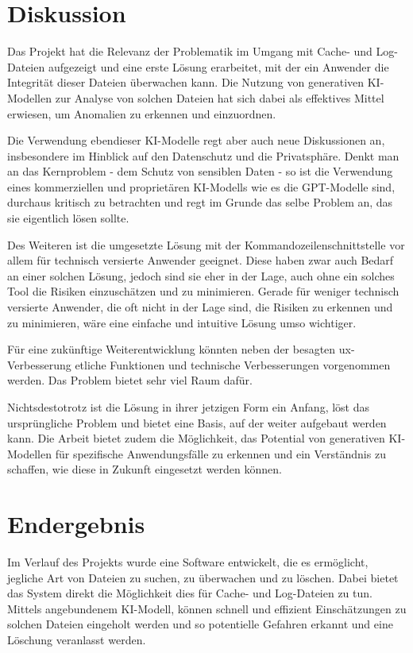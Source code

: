 \documentclass[a4paper,12pt]{report}
\begin{document}
    \section{Diskussion}
    Das Projekt hat die Relevanz der Problematik im Umgang mit Cache- und Log-Dateien aufgezeigt und eine erste Lösung erarbeitet, mit der ein Anwender die Integrität dieser Dateien überwachen kann.
    Die Nutzung von generativen KI-Modellen zur Analyse von solchen Dateien hat sich dabei als effektives Mittel erwiesen, um Anomalien zu erkennen und einzuordnen.

    Die Verwendung ebendieser KI-Modelle regt aber auch neue Diskussionen an, insbesondere im Hinblick auf den Datenschutz und die Privatsphäre.
    Denkt man an das Kernproblem - dem Schutz von sensiblen Daten - so ist die Verwendung eines kommerziellen und proprietären KI-Modells wie es die GPT-Modelle sind, durchaus kritisch zu betrachten
    und regt im Grunde das selbe Problem an, das sie eigentlich lösen sollte.

    Des Weiteren ist die umgesetzte Lösung mit der Kommandozeilenschnittstelle vor allem für technisch versierte Anwender geeignet.
    Diese haben zwar auch Bedarf an einer solchen Lösung, jedoch sind sie eher in der Lage, auch ohne ein solches Tool die Risiken einzuschätzen und zu minimieren.
    Gerade für weniger technisch versierte Anwender, die oft nicht in der Lage sind, die Risiken zu erkennen und zu minimieren, wäre eine einfache und intuitive Lösung umso wichtiger.

    Für eine zukünftige Weiterentwicklung könnten neben der besagten \gls{ux}-Verbesserung etliche Funktionen und technische Verbesserungen vorgenommen werden.
    Das Problem bietet sehr viel Raum dafür.

    Nichtsdestotrotz ist die Lösung in ihrer jetzigen Form ein Anfang, löst das ursprüngliche Problem und bietet eine Basis, auf der weiter aufgebaut werden kann.
    Die Arbeit bietet zudem die Möglichkeit, das Potential von generativen KI-Modellen für spezifische Anwendungsfälle zu erkennen und ein Verständnis zu schaffen, wie diese in Zukunft eingesetzt werden können.

    \clearpage


    \section{Endergebnis}\label{sec:endergebnis}
    Im Verlauf des Projekts wurde eine Software entwickelt, die es ermöglicht, jegliche Art von Dateien zu suchen, zu überwachen und zu löschen.
    Dabei bietet das System direkt die Möglichkeit dies für Cache- und Log-Dateien zu tun.
    Mittels angebundenem KI-Modell, können schnell und effizient Einschätzungen zu solchen Dateien eingeholt werden und so potentielle Gefahren erkannt und eine Löschung veranlasst werden.
\end{document}
